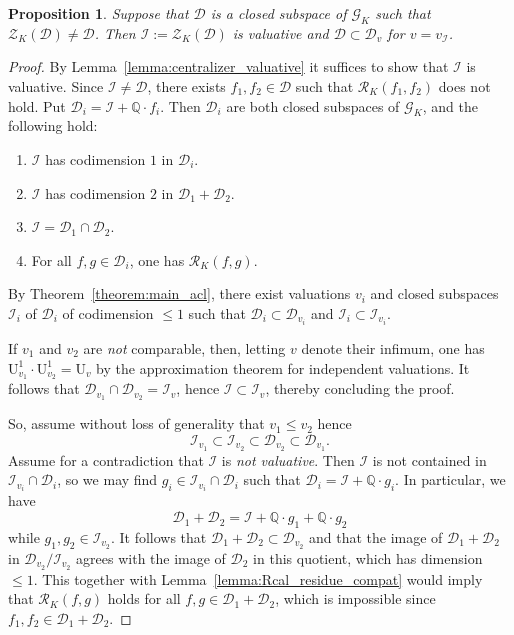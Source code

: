 \documentclass[12pt]{amsart}
\newcommand{\Qbb}{\mathbb{Q}}
\newcommand{\Urm}{\mathrm{U}}
\newcommand{\Zcal}{\mathcal{Z}}
\newcommand{\Gcal}{\mathcal{G}}
\newcommand{\Rcal}{\mathcal{R}}
\newcommand{\Dcal}{\mathcal{D}}
\newcommand{\Ical}{\mathcal{I}}
\newtheorem{proposition}[theorem]{Proposition}
\theoremstyle{definition}
\begin{document}
\begin{proposition}\label{proposition:centre_valuative}
  Suppose that $\Dcal$ is a closed subspace of $\Gcal_{K}$ such that $\Zcal_{K}(\Dcal) \neq \Dcal$.
  Then $\Ical := \Zcal_{K}(\Dcal)$ is valuative and $\Dcal \subset \Dcal_{v}$ for $v = v_{\Ical}$.
\end{proposition}
\begin{proof}
  By Lemma~\ref{lemma:centralizer_valuative} it suffices to show that $\Ical$ is valuative.
  Since $\Ical \neq \Dcal$, there exists $f_{1},f_{2} \in \Dcal$ such that $\Rcal_{K}(f_{1},f_{2})$ does not hold.
  Put $\Dcal_{i} = \Ical + \Qbb \cdot f_{i}$.
  Then $\Dcal_{i}$ are both closed subspaces of $\Gcal_{K}$, and the following hold:
  \begin{enumerate}
    \item $\Ical$ has codimension $1$ in $\Dcal_{i}$.
    \item $\Ical$ has codimension $2$ in $\Dcal_{1} + \Dcal_{2}$.
    \item $\Ical = \Dcal_{1} \cap \Dcal_{2}$.
    \item For all $f,g \in \Dcal_{i}$, one has $\Rcal_{K}(f,g)$.
  \end{enumerate}
  By Theorem~\ref{theorem:main_acl}, there exist valuations $v_{i}$ and closed subspaces $\Ical_{i}$ of $\Dcal_{i}$ of codimension $\leq 1$ such that $\Dcal_{i} \subset \Dcal_{v_{i}}$ and $\Ical_{i} \subset \Ical_{v_{i}}$.

  If $v_{1}$ and $v_{2}$ are \emph{not} comparable, then, letting $v$ denote their infimum, one has $\Urm_{v_{1}}^{1} \cdot \Urm_{v_{2}}^{1} = \Urm_{v}$ by the approximation theorem for independent valuations.
  It follows that $\Dcal_{v_{1}} \cap \Dcal_{v_{2}} = \Ical_{v}$, hence $\Ical \subset \Ical_{v}$, thereby concluding the proof.

  So, assume without loss of generality that $v_{1} \le v_{2}$ hence
  \[ \Ical_{v_{1}} \subset \Ical_{v_{2}} \subset \Dcal_{v_{2}} \subset \Dcal_{v_{1}}. \]
  Assume for a contradiction that $\Ical$ is \emph{not valuative}.
  Then $\Ical$ is not contained in $\Ical_{v_{i}} \cap \Dcal_{i}$, so we may find $g_{i} \in \Ical_{v_{i}} \cap \Dcal_{i}$ such that $\Dcal_{i} = \Ical + \Qbb \cdot g_{i}$.
  In particular, we have
  \[ \Dcal_{1} + \Dcal_{2} = \Ical + \Qbb \cdot g_{1} + \Qbb \cdot g_{2} \]
  while $g_{1},g_{2} \in \Ical_{v_{2}}$.
  It follows that $\Dcal_{1} + \Dcal_{2} \subset \Dcal_{v_{2}}$ and that the image of $\Dcal_{1} + \Dcal_{2}$ in $\Dcal_{v_{2}}/\Ical_{v_{2}}$ agrees with the image of $\Dcal_{2}$ in this quotient, which has dimension $\leq 1$.
  This together with Lemma~\ref{lemma:Rcal_residue_compat} would imply that $\Rcal_{K}(f,g)$ holds for all $f,g \in \Dcal_{1} + \Dcal_{2}$, which is impossible since $f_{1},f_{2} \in \Dcal_{1} + \Dcal_{2}$.
\end{proof}
\end{document}

